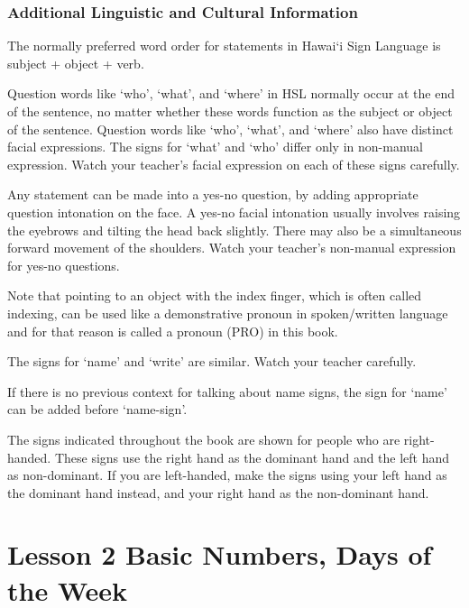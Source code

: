 \documentclass{tufte-book}
\begin{document}
\begin{enumerate}
\begin{description}
\end{description}

\end{enumerate}

\subsection{Additional Linguistic and Cultural Information}

The normally preferred word order for statements in Hawai`i Sign Language is subject + object + verb.

Question words like `who', `what', and `where' in HSL normally occur at the end of the sentence, no matter whether these words function as the subject or object of the sentence. Question words like `who', `what', and `where' also have distinct facial expressions. The signs for `what' and  `who' differ only in non-manual expression. Watch your teacher’s facial expression on each of these signs carefully.

Any statement can be made into a yes-no question, by adding appropriate question intonation on the face. A yes-no facial intonation usually involves raising the eyebrows and tilting the head back slightly. There may also be a simultaneous forward movement of the shoulders. Watch your teacher’s non-manual expression for yes-no questions.

Note that pointing to an object with the index finger, which is often called indexing, can be used like a demonstrative pronoun in spoken/written language and for that reason is called a pronoun (PRO) in this book.

The signs for `name' and `write' are similar. Watch your teacher carefully.

If there is no previous context for talking about name signs, the sign for `name' can be added before `name-sign'.

The signs indicated throughout the book are shown for people who are right-handed. These signs use the right hand as the dominant hand and the left hand as non-dominant. If you are left-handed, make the signs using your  left hand as the dominant hand instead, and your right hand as the non-dominant hand.

\chapter{Lesson 2 Basic Numbers, Days of the Week}
\end{document}
